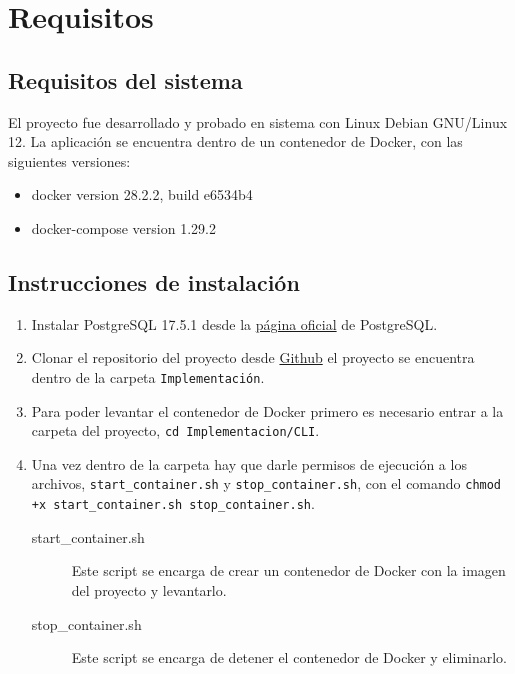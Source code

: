 	\section{Requisitos}
	\subsection{Requisitos del sistema}
	\noindent El proyecto fue desarrollado y probado en sistema con Linux Debian GNU/Linux 12. La aplicación se encuentra dentro de un contenedor de Docker, con las siguientes versiones:

	\begin{itemize}
		\item docker version 28.2.2, build e6534b4
		\item docker-compose version 1.29.2
	\end{itemize}

	\subsection{Instrucciones de instalaci\'on}
	\begin{enumerate}
		\item Instalar PostgreSQL 17.5.1 desde la \href{https://www.postgresql.org/download/}{p\'agina oficial} de PostgreSQL.
		\item Clonar el repositorio del proyecto desde \href{https://github.com/Ic3manMtz/Servicio-Social.git}{Github} el proyecto se encuentra dentro de la carpeta \texttt{Implementaci\'on}.
		\item Para poder levantar el contenedor de Docker primero es necesario entrar a la carpeta del proyecto, \texttt{cd Implementacion/CLI}.
		\item Una vez dentro de la carpeta hay que darle permisos de ejecución a los archivos, \texttt{start\_container.sh} y \texttt{stop\_container.sh}, con el comando \texttt{chmod +x start\_container.sh stop\_container.sh}.
		\begin{description}
			\item[start\_container.sh] Este script se encarga de crear un contenedor de Docker con la imagen del proyecto y levantarlo.
			\item[stop\_container.sh] Este script se encarga de detener el contenedor de Docker y eliminarlo.
		\end{description}
	\end{enumerate}

